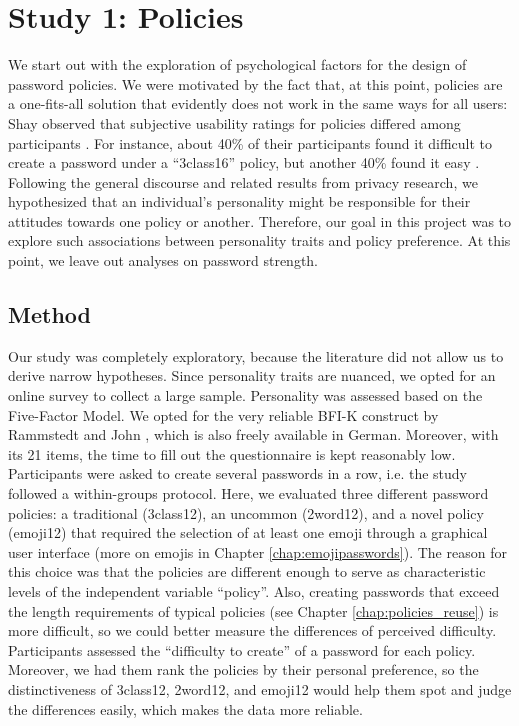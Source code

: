 \section{Study 1: Policies}\label{sec:personality:study-1}
We start out with the exploration of psychological factors for the design of password policies. We were motivated by the fact that, at this point, policies are a one-fits-all solution that evidently does not work in the same ways for all users: Shay \etal observed that subjective usability ratings for policies differed among participants \cite{Shay2012CorrectHorseBatteryStaple, Shay2014CanLongPasswordsBeSecureAndUsable}. For instance, about 40\% of their participants found it difficult to create a password under a ``3class16'' policy, but another 40\% found it easy \cite{Shay2014CanLongPasswordsBeSecureAndUsable}. Following the general discourse and related results from privacy research, we hypothesized that an individual's personality might be responsible for their attitudes towards one policy or another. Therefore, our goal in this project was to explore such associations between personality traits and policy preference. At this point, we leave out analyses on password strength.
\subsection{Method}
Our study was completely exploratory, because the literature did not allow us to derive narrow hypotheses. Since personality traits are nuanced, we opted for an online survey to collect a large sample. Personality was assessed based on the Five-Factor Model. We opted for the very reliable BFI-K construct by Rammstedt and John \cite{Rammstedt2005BFI}, which is also freely available in German. Moreover, with its 21 items, the time to fill out the questionnaire is kept reasonably low. 
Participants were asked to create several passwords in a row, i.e. the study followed a within-groups protocol. Here, we evaluated three different password policies: a traditional (3class12), an uncommon (2word12), and a novel policy (emoji12) that required the selection of at least one emoji through a graphical user interface (more on emojis in Chapter \ref{chap:emojipasswords}). The reason for this choice was that the policies are different enough to serve as characteristic levels of the independent variable ``policy''. Also, creating passwords that exceed the length requirements of typical policies (see Chapter \ref{chap:policies_reuse}) is more difficult, so we could better measure the differences of perceived difficulty. Participants assessed the ``difficulty to create'' of a password for each policy. Moreover, we had them rank the policies by their personal preference, so the distinctiveness of 3class12, 2word12, and emoji12 would help them spot and judge the differences easily, which makes the data more reliable.

